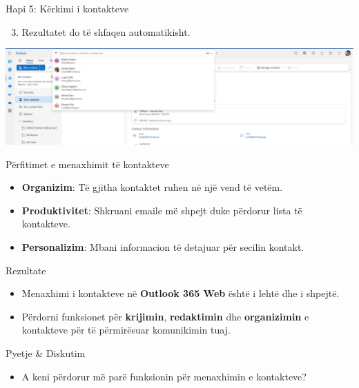 \documentclass[
  ignorenonframetext,
]{beamer}
\providecommand{\tightlist}{%
  \setlength{\itemsep}{0pt}\setlength{\parskip}{0pt}}
\begin{document}
\begin{frame}{Hapi 5: Kërkimi i kontakteve}
\label{hapi-5-kuxebrkimi-i-kontakteve-1}
\begin{enumerate}
\setcounter{enumi}{2}
\tightlist
\item
  Rezultatet do të shfaqen automatikisht.
\end{enumerate}

\includegraphics{./images/outlook26.png}
\end{frame}

\begin{frame}{Përfitimet e menaxhimit të kontakteve}
\label{puxebrfitimet-e-menaxhimit-tuxeb-kontakteve}
\begin{itemize}
\item
  \textbf{Organizim}: Të gjitha kontaktet ruhen në një vend të vetëm.
\item
  \textbf{Produktivitet}: Shkruani emaile më shpejt duke përdorur lista
  të kontakteve.
\item
  \textbf{Personalizim}: Mbani informacion të detajuar për secilin
  kontakt.
\end{itemize}
\end{frame}

\begin{frame}{Rezultate}
\label{rezultate-1}
\begin{itemize}
\item
  Menaxhimi i kontakteve në \textbf{Outlook 365 Web} është i lehtë dhe i
  shpejtë.
\item
  Përdorni funksionet për \textbf{krijimin}, \textbf{redaktimin} dhe
  \textbf{organizimin} e kontakteve për të përmirësuar komunikimin tuaj.
\end{itemize}
\end{frame}

\begin{frame}{Pyetje \& Diskutim}
\label{pyetje-diskutim-4}
\begin{itemize}
\tightlist
\item
  A keni përdorur më parë funksionin për menaxhimin e kontakteve?
\end{itemize}
\end{frame}
\end{document}
